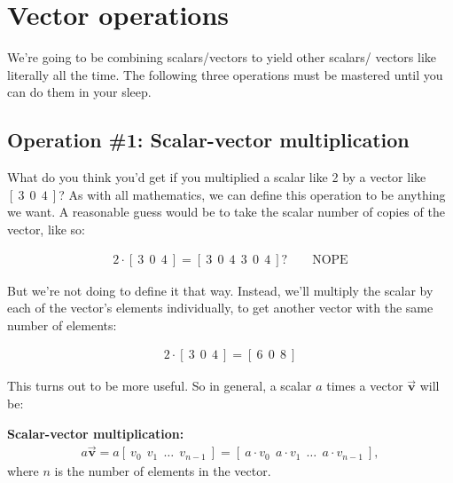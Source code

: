 \section{Vector operations}
\label{vectorOps}

We're going to be combining scalars/vectors to yield other scalars/ vectors
like literally all the time. The following three operations must be mastered
until you can do them in your sleep.

\subsection{Operation \#1: Scalar-vector multiplication}

\label{scalarVectorMultiplication}

What do you think you'd get if you multiplied a scalar like 2 by a vector like
$[\ 3\ \ 0\ \ 4\ ]$? As with all mathematics, we can define this operation to
be anything we want. A reasonable guess would be to take the scalar number of
copies of the vector, like so:

\vspace{-.15in}
\begin{align*}
2 \cdot [\ 3\ \ 0\ \ 4\ ] = [\ 3\ \ 0\ \ 4\ \ 3\ \ 0\ \ 4\ ] ? \quad  \quad
\textrm{NOPE}
\end{align*}
\vspace{-.15in}

But we're not doing to define it that way. Instead, we'll multiply the scalar
by each of the vector's elements individually, to get another vector with the
same number of elements:

\vspace{-.15in}
\begin{align*}
2 \cdot [\ 3\ \ 0\ \ 4\ ] = [\ 6\ \ 0\ \ 8\ ]
\end{align*}
\vspace{-.15in}


This turns out to be more useful. So in general, a scalar $a$ times a vector
$\overrightarrow{\textbf{v}}$ will be:

\vspace{-.15in}
\begin{center}
\begin{framed}
\textbf{Scalar-vector multiplication:}
\begin{align*}
a \overrightarrow{\textbf{v}} = a [\ v_0\ \ v_1\ \ \dots \ \ v_{n-1}\ ] =
[\ a \cdot v_0\ \ a \cdot v_1\ \ \dots \ \ a \cdot v_{n-1}\ ],
\end{align*}
where $n$ is the number of elements in the vector.
\end{framed}
\end{center}
\vspace{-.15in}

